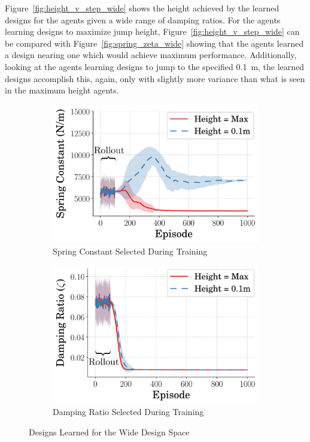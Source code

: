 Figure~\ref{fig:height_v_step_wide} shows the height achieved by the learned designs for the agents given a wide range of damping ratios. For the agents learning designs to maximize jump height, Figure~\ref{fig:height_v_step_wide} can be compared with Figure~\ref{fig:spring_zeta_wide} showing that the agents learned a design nearing one which would achieve maximum performance. Additionally, looking at the agents learning designs to jump to the specified 0.1~m, the learned designs accomplish this, again, only with slightly more variance than what is seen in the maximum height agents. 
%  
\begin{figure}[tb!]
        \centering
        \begin{subfigure}{.49\textwidth}
                \centering
        \includegraphics[width=\textwidth]{figures//Ch4/design_space_wide/SpringVsTime.png}  
        \caption{Spring Constant Selected During Training}
        \label{fig:spring_v_step_wide}
        \end{subfigure}%
        \hfill
        \begin{subfigure}{.49\textwidth}
                \centering
        \includegraphics[width=\textwidth]{figures//Ch4/design_space_wide/ZetaVsTime.png}  
        \caption{Damping Ratio Selected During Training}
        \label{fig:zeta_vs_step_wide}
        \end{subfigure}
         \caption{Designs Learned for the Wide Design Space}
         \label{fig:des_vs_step_wide}
\end{figure}
%


